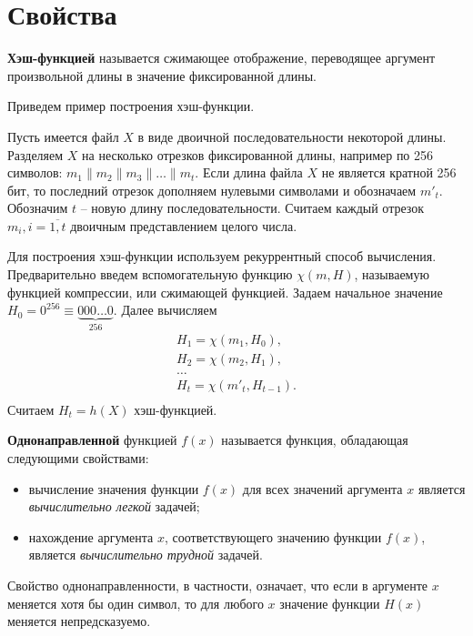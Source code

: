 \section{Свойства}

\textbf{Хэш-функцией} называется сжимающее отображение, переводящее аргумент произвольной длины в значение фиксированной длины.

\example
Приведем пример построения хэш-функции.

Пусть имеется файл $X$ в виде двоичной последовательности некоторой длины. Разделяем $X$ на несколько отрезков фиксированной длины, например по 256 символов:  $m_{1} \| m_{2} \| m_{3} \| \ldots \| m_{t}$. Если длина файла $X$ не является кратной 256 бит, то последний отрезок дополняем нулевыми символами и обозначаем $m'_{t}$.
Обозначим $t$ -- новую длину последовательности. Считаем каждый отрезок $m_i, i = \overline{1,t}$ двоичным представлением целого числа.

Для построения хэш-функции используем рекуррентный способ вычисления. Предварительно введем вспомогательную функцию $\chi(m, H)$, называемую функцией компрессии, или сжимающей функцией. Задаем начальное значение $H_{0} = 0^{256} \equiv \underbrace{000 \ldots 0}_{256} $. Далее вычисляем
\[ \begin{array}{l}
    H_1 = \chi( m_1, H_0), \\
    H_2 = \chi( m_2, H_1), \\
    \dots \\
    H_t = \chi( m'_t, H_{t-1}). \\
\end{array} \]
Считаем $H_{t} = h(X)$ хэш-функцией.
\exampleend

\textbf{Однонаправленной} функцией $f(x)$ называется функция, обладающая следующими свойствами:
\begin{itemize}
    \item вычисление значения функции $f(x)$ для всех значений аргумента $ x$ является \textit{вычислительно легкой} задачей;
    \item нахождение аргумента $x$, соответствующего значению  функции $f(x)$, является \textit{вычислительно трудной} задачей.
\end{itemize}

Свойство однонаправленности, в частности, означает, что если в аргументе $x$ меняется хотя бы один символ, то для любого $x$ значение функции $H(x)$ меняется непредсказуемо.

